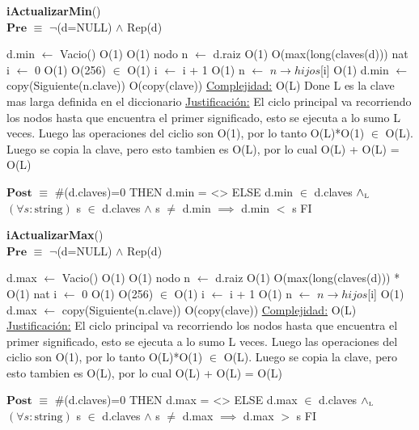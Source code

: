 \begin{algorithm}[H]{\textbf{iActualizarMin}()}
	{\\ $\textbf{Pre}$ $\equiv$ $\lnot$(d=NULL) $\land$ Rep(d) }
	\begin{algorithmic}[1]
		\State d.min $\gets$ Vacio()					\Comment O(1)
		 								\Comment O(1)
			\State nodo n $\gets$ d.raiz						\Comment O(1)
					\Comment O(max(long(claves(d)))
				\State nat i $\gets$ 0								\Comment O(1)
				 		\Comment O(256) $\in$ O(1)
					\State i $\gets$ i + 1				\Comment O(1)
				\EndWhile
				\State n $\gets$ $n \rightarrow hijos$[i]			\Comment O(1)
			\EndWhile
			\State d.min $\gets$  copy(Siguiente(n.clave)) \Comment O(copy(clave))  
		\EndIf
		\medskip
		\Statex \underline{Complejidad:} O(L) Done L es la clave mas larga definida en el diccionario
		\Statex \underline{Justificación:} El ciclo principal va recorriendo los nodos hasta que encuentra el primer significado, esto se ejecuta a lo sumo L veces. Luego las operaciones del ciclio son O(1), por lo tanto O(L)*O(1) $\in$ O(L). Luego se copia la clave, pero esto tambien es O(L), por lo cual O(L) + O(L) = O(L)
    \end{algorithmic}
    {$\textbf{Post}$ $\equiv$ \IF \#(d.claves)=0 THEN d.min = <> ELSE  d.min $\in$ d.claves $\land_{\mathrm{\scriptscriptstyle{L}}}$  $(\forall s:\text{string})$ s $\in$ d.claves $\land$ s $\neq$ d.min $\implies$ d.min $<$ s  FI  }
\end{algorithm}


\begin{algorithm}[H]{\textbf{iActualizarMax}()}
	{\\ $\textbf{Pre}$ $\equiv$ $\lnot$(d=NULL) $\land$ Rep(d) }
	\begin{algorithmic}[1]
		\State d.max $\gets$ Vacio()					\Comment O(1)
		 								\Comment O(1)
			\State nodo n $\gets$ d.raiz						\Comment O(1)
												\Comment O(max(long(claves(d))) * O(1)
				\State nat i $\gets$ 0								\Comment O(1)
				 		\Comment O(256) $\in$ O(1)
					\State i $\gets$ i + 1				\Comment O(1)
				\EndWhile
				\State n $\gets$ $n \rightarrow hijos$[i]			\Comment O(1)
			\EndWhile
			\State d.max $\gets$  copy(Siguiente(n.clave)) \Comment O(copy(clave))  
		\EndIf
		\medskip
		\Statex \underline{Complejidad:} O(L)
		\Statex \underline{Justificación:} El ciclo principal va recorriendo los nodos hasta que encuentra el primer significado, esto se ejecuta a lo sumo L veces. Luego las operaciones del ciclio son O(1), por lo tanto O(L)*O(1) $\in$ O(L). Luego se copia la clave, pero esto tambien es O(L), por lo cual O(L) + O(L) = O(L)
    \end{algorithmic}
    {$\textbf{Post}$ $\equiv$ \IF \#(d.claves)=0 THEN d.max = <> ELSE d.max $\in$ d.claves $\land_{\mathrm{\scriptscriptstyle{L}}}$  $(\forall s:\text{string})$ s $\in$ d.claves $\land$ s $\neq$ d.max $\implies$ d.max $>$ s  FI  }
\end{algorithm}


